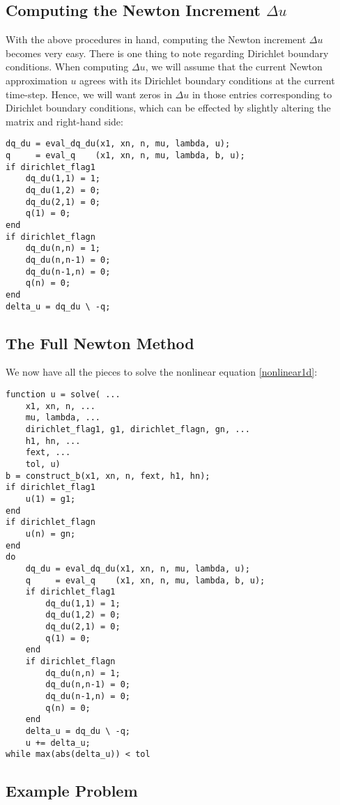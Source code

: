\documentclass{article}
\begin{document}
\subsection{Computing the Newton Increment \(\Delta u\)}

With the above procedures in hand, computing the Newton increment \(\Delta u\) becomes very easy.  There is one thing to note regarding Dirichlet boundary conditions.  When computing \(\Delta u\), we will assume that the current Newton approximation \(u\) agrees with its Dirichlet boundary conditions at the current time-step.  Hence, we will want zeros in \(\Delta u\) in those entries corresponding to Dirichlet boundary conditions, which can be effected by slightly altering the matrix and right-hand side:

\begin{verbatim}
dq_du = eval_dq_du(x1, xn, n, mu, lambda, u);
q     = eval_q    (x1, xn, n, mu, lambda, b, u);
if dirichlet_flag1
    dq_du(1,1) = 1;
    dq_du(1,2) = 0;
    dq_du(2,1) = 0;
    q(1) = 0;
end
if dirichlet_flagn
    dq_du(n,n) = 1;
    dq_du(n,n-1) = 0;
    dq_du(n-1,n) = 0;
    q(n) = 0;
end
delta_u = dq_du \ -q;
\end{verbatim}

\subsection{The Full Newton Method}

We now have all the pieces to solve the nonlinear equation \eqref{nonlinear1d}:

\begin{verbatim}
function u = solve( ...
    x1, xn, n, ...
    mu, lambda, ...
    dirichlet_flag1, g1, dirichlet_flagn, gn, ...
    h1, hn, ...
    fext, ...
    tol, u)
b = construct_b(x1, xn, n, fext, h1, hn);
if dirichlet_flag1
    u(1) = g1;
end
if dirichlet_flagn
    u(n) = gn;
end
do
    dq_du = eval_dq_du(x1, xn, n, mu, lambda, u);
    q     = eval_q    (x1, xn, n, mu, lambda, b, u);
    if dirichlet_flag1
        dq_du(1,1) = 1;
        dq_du(1,2) = 0;
        dq_du(2,1) = 0;
        q(1) = 0;
    end
    if dirichlet_flagn
        dq_du(n,n) = 1;
        dq_du(n,n-1) = 0;
        dq_du(n-1,n) = 0;
        q(n) = 0;
    end
    delta_u = dq_du \ -q;
    u += delta_u;
while max(abs(delta_u)) < tol
\end{verbatim}

\subsection{Example Problem}
\end{document}
